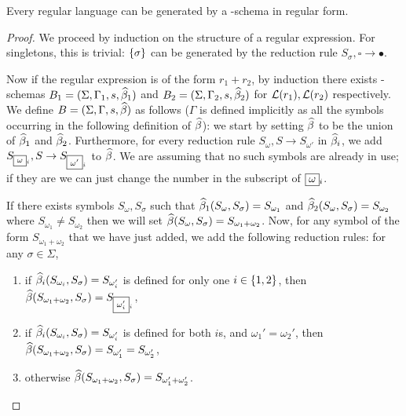 \documentclass{llncs}
\begin{document}
\begin{theorem}

    Every regular language can be generated by a \BR-schema in regular form.

\end{theorem}

\begin{proof}

    We proceed by induction on the structure of a regular expression.
    For singletons, this is trivial: $\set\sigma$ can be generated by the reduction rule $S_\sigma,\square\to\bullet$.

    Now if the regular expression is of the form $r_1+r_2$, by induction there exists \BR-schemas $B_1=(\Sigma,\Gamma_1,s,\widehat\beta_1)$ and $B_2=(\Sigma,\Gamma_2,s,\widehat\beta_2)$ for $\mathcal{L}(r_1),\mathcal{L}(r_2)$ respectively.
    We define $B=(\Sigma,\Gamma,s,\widehat\beta)$ as follows ($\Gamma$ is defined implicitly as all the symbols occurring in the following definition of $\widehat\beta$): we start by setting $\widehat\beta$ to be the union of $\widehat\beta_1$ and $\widehat\beta_2$.
    Furthermore, for every reduction rule $S_\omega,S\to S_{\omega'}$ in $\widehat\beta_i$, we add $S_{\mbox\omega_i},S\to S_{\mbox{\omega'}_i}$ to $\widehat\beta$.
    We are assuming that no such symbols are already in use; if they are we can just change the number in the subscript of $\mbox{\omega}_i$.

    If there exists symbols $S_\omega,S_\sigma$ such that $\widehat\beta_1(S_\omega,S_\sigma)=S_{\omega_1}$ and $\widehat\beta_2(S_\omega,S_\sigma)=S_{\omega_2}$ where $S_{\omega_1}\neq S_{\omega_2}$ then we will set $\widehat\beta(S_\omega,S_\sigma)=S_{\omega_1+\omega_2}$.
    Now, for any symbol of the form $S_{\omega_1+\omega_2}$ that we have just added, we add the following reduction rules: for any $\sigma\in\Sigma$,
    \begin{enumerate}
        \item if $\widehat\beta_i(S_{\omega_i},S_\sigma)=S_{\omega_i'}$ is defined for only one $i\in\set{1,2}$, then $\hb(S_{\omega_1+\omega_2},S_\sigma)=S_{\mbox{\omega_i'}_i}$,
        \item if $\widehat\beta_i(S_{\omega_i},S_\sigma)=S_{\omega_i'}$ is defined for both $i$s, and $\omega_1'=\omega_2'$, then $\widehat\beta(S_{\omega_1+\omega_2},S_\sigma)=S_{\omega_1'}=S_{\omega_2'}$,
        \item otherwise $\widehat\beta(S_{\omega_1+\omega_2},S_\sigma)=S_{\omega_1'+\omega_2'}$.
    \end{enumerate}


\end{proof}
\end{document}
